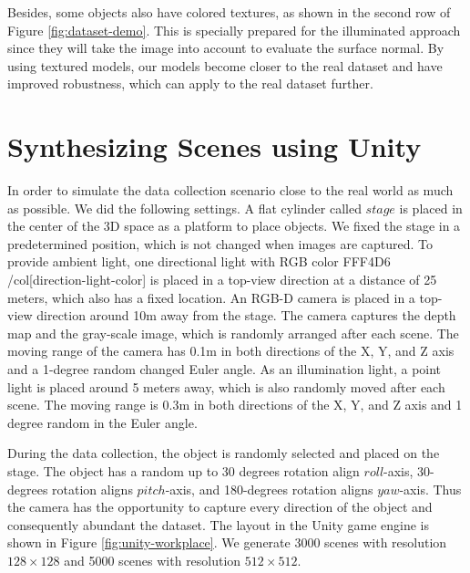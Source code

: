 Besides, some objects also have colored textures, as shown in the second row of Figure \ref{fig:dataset-demo}. This is specially prepared for the illuminated approach since they will take the image into account to evaluate the surface normal. By using textured models, our models become closer to the real dataset and have improved robustness, which can apply to the real dataset further.



\newcommand{\col}[1]{%
	\textcolor{#1}{\vrule width 0.5cm}}
\section{Synthesizing Scenes using Unity}
In order to simulate the data collection scenario close to the real world as much as possible. We did the following settings. A flat cylinder called $ stage $ is placed in the center of the 3D space as a platform to place objects. We fixed the stage in a predetermined position, which is not changed when images are captured. 
To provide ambient light, one directional light with RGB color FFF4D6 /col[direction-light-color] is placed in a top-view direction at a distance of 25 meters, which also has a fixed location.
An RGB-D camera is placed in a top-view direction around 10m away from the stage. The camera captures the depth map and the gray-scale image, which is randomly arranged after each scene. The moving range of the camera has 0.1m in both directions of the X, Y, and Z axis and a 1-degree random changed Euler angle. 
As an illumination light, a point light is placed around 5 meters away, which is also randomly moved after each scene. The moving range is 0.3m in both directions of the X, Y, and Z axis and 1 degree random in the Euler angle.

During the data collection, the object is randomly selected and placed on the stage. The object has a random up to 30 degrees rotation align $ roll $-axis, 30-degrees rotation aligns $ pitch $-axis, and 180-degrees rotation aligns $ yaw $-axis. Thus the camera has the opportunity to capture every direction of the object and consequently abundant the dataset. The layout in the Unity game engine is shown in Figure \ref{fig:unity-workplace}. We generate 3000 scenes with resolution $ 128\times128 $ and 5000 scenes with resolution $ 512\times512 $.

